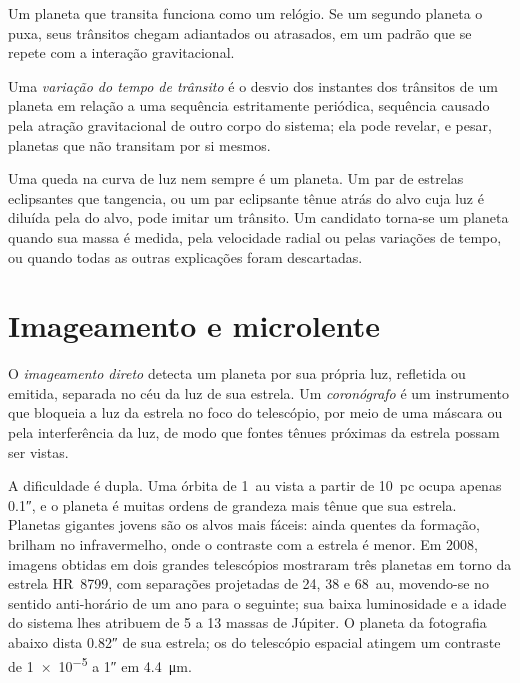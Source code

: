 Um planeta que transita funciona como um relógio. Se um segundo planeta o puxa, seus
trânsitos chegam adiantados ou atrasados, em um padrão que se repete com a
interação gravitacional.

\begin{definition}\label{def:b3:exoplanets:ttv}
Uma \emph{variação do tempo de trânsito} é o
desvio dos instantes dos trânsitos de um planeta em relação a uma sequência estritamente periódica,
sequência causado pela atração gravitacional de outro corpo do
sistema; ela pode revelar, e pesar, planetas que não transitam por
si mesmos.
\end{definition}

Uma queda na curva de luz nem sempre é um planeta. Um par de estrelas eclipsantes
que tangencia, ou um par eclipsante tênue atrás do alvo cuja
luz é diluída pela do alvo, pode imitar um trânsito. Um candidato torna-se
um planeta quando sua massa é medida, pela velocidade radial ou pelas variações
de tempo, ou quando todas as outras explicações foram descartadas.

\section{Imageamento e microlente}\label{sec:b3:exoplanets:imaging}

\begin{definition}\label{def:b3:exoplanets:imaging}
O \emph{imageamento direto} detecta um planeta por sua própria
luz, refletida ou emitida, separada no céu da luz de sua
estrela. Um \emph{coronógrafo} é um instrumento que bloqueia
a luz da estrela no foco do telescópio, por meio de uma máscara ou pela
interferência da luz, de modo que fontes tênues próximas da estrela possam ser
vistas.
\end{definition}

A dificuldade é dupla. Uma órbita de \qty{1}{au} vista a partir de \qty{10}{pc}
ocupa apenas \ang{;;0.1}, e o planeta é muitas ordens de grandeza mais tênue
que sua estrela. Planetas gigantes jovens são os alvos mais fáceis: ainda quentes da
formação, brilham no infravermelho, onde o contraste com a estrela é
menor. Em 2008, imagens obtidas em dois grandes telescópios mostraram três
planetas em torno da estrela HR~8799, com separações projetadas de 24, 38 e
\qty{68}{au}, movendo-se no sentido anti-horário de um ano para o seguinte; sua
baixa luminosidade e a idade do sistema lhes atribuem de 5 a 13
massas de Júpiter. O planeta da fotografia abaixo dista \ang{;;0.82} de sua
estrela; os  do telescópio espacial atingem um contraste de
\num{1e-5} a \ang{;;1} em \qty{4.4}{\micro m}.

